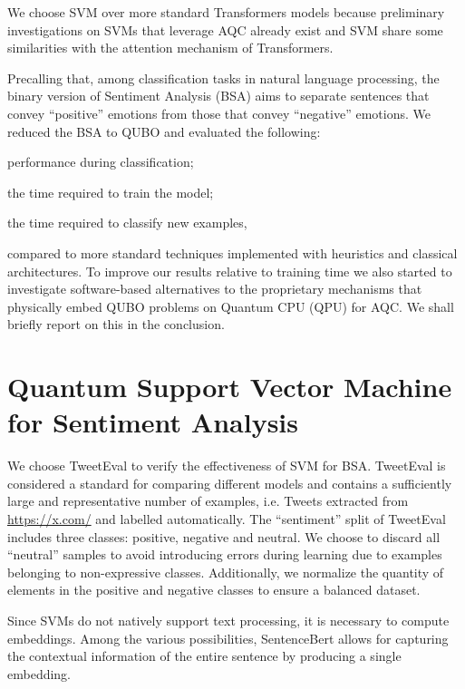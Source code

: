\documentclass{ceurart}
\begin{document}
We choose SVM\cite{SVM} over more standard Transformers models because preliminary investigations on SVMs that leverage AQC already exist\cite{QSVM} and SVM share some similarities with the attention mechanism of Transformers\cite{TransformerSVM}.

Precalling that, among classification tasks in natural language processing, the binary version of Sentiment Analysis (BSA) aims to separate sentences that convey ``positive'' emotions from those that convey ``negative'' emotions. We reduced the BSA to QUBO and evaluated the following:
\begin{enumerate*}[label=\arabic*)]
    \item performance during classification;
    \item the time required to train the model;
    \item the time required to classify new examples,
\end{enumerate*}
compared to more standard techniques implemented with heuristics and classical architectures. To improve our results relative to training time we also started to investigate software-based alternatives to the proprietary mechanisms that physically embed QUBO problems on Quantum CPU (QPU) for AQC. We shall briefly report on this in the conclusion.

\section{Quantum Support Vector Machine for Sentiment Analysis}

We choose TweetEval\cite{TweetEval} to verify the effectiveness of SVM for BSA. TweetEval is considered a standard for comparing different models and contains a sufficiently large and representative number of examples, i.e. Tweets extracted from \url{https://x.com/} and labelled automatically. The ``sentiment'' split of TweetEval includes three classes: positive, negative and neutral. We choose to discard all ``neutral'' samples to avoid introducing errors during learning due to examples belonging to non-expressive classes. Additionally, we normalize the quantity of elements in the positive and negative classes to ensure a balanced dataset.

Since SVMs do not natively support text processing, it is necessary to compute embeddings. Among the various possibilities, SentenceBert\cite{SentenceBert} allows for capturing the contextual information of the entire sentence by producing a single embedding.
\end{document}
